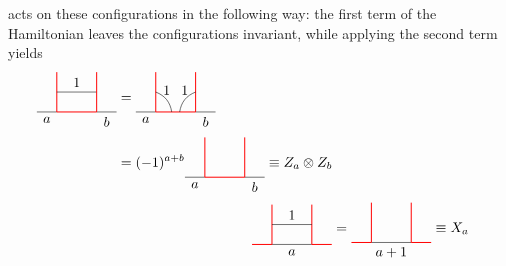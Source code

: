 acts on these configurations in the following way: the first term of the Hamiltonian leaves the configurations invariant, while applying the second term yields
	\begin{align}\label{eq:action}
	\begin{split}
		\begin{tikzpicture}[scale=1,baseline=(current bounding box.center)]
			\draw (-0.5,0) to node [below] {$a$} (0,0);
			\draw [red, line width=0.25mm] (0,0) -- (1,0);
			\draw (1,0) to node [below] {$b$} (1.5,0);
			\draw [red, line width=0.25mm] (0,0) -- (0,1);
			\draw (0,0.5) to node[above] {$1$} (1,0.5);
			\draw [red, line width=0.25mm] (1,0) -- (1,1);
		\end{tikzpicture}&=
		\begin{tikzpicture}[scale=1,baseline=(current bounding box.center)]
			\draw (-0.5,0) to node [below] {$a$} (0,0);
			\draw [red, line width=0.25mm] (0,0) -- (1,0);
			\draw (1,0) to node [below] {$b$} (1.5,0);
			\draw [red, line width=0.25mm] (0,0) -- (0,1);
			\draw [red, line width=0.25mm] (1,0) -- (1,1);
			\draw (0,0.5) to[bend left] node[above] {$1$} (0.4,0);
			\draw (1,0.5) to[bend right] node[above] {$1$} (0.6,0);
		\end{tikzpicture}\\
		&=(-1)^{a+b}
		\begin{tikzpicture}[scale=1,baseline=(current bounding box.center)]
			\draw (-0.5,0) to node [below] {$a$} (0,0);
			\draw [red, line width=0.25mm] (0,0) -- (1,0);
			\draw (1,0) to node [below] {$b$} (1.5,0);
			\draw [red, line width=0.25mm] (0,0) -- (0,1);
			\draw [red, line width=0.25mm] (1,0) -- (1,1);
		\end{tikzpicture}\equiv Z_a\otimes Z_b
		\end{split}
		\\\label{eq:action2}
		\begin{tikzpicture}[scale=1,baseline=(current bounding box.center)]
			\draw [red, line width=0.25mm] (-0.5,0) -- (0,0);
			\draw (0,0) to node[below] {$a$} (1,0);
			\draw [red, line width=0.25mm] (1,0) -- (1.5,0);
			\draw [red, line width=0.25mm] (0,0) -- (0,1);
			\draw [red, line width=0.25mm] (1,0) -- (1,1);
			\draw (0,0.5) to node[above] {$1$} (1,0.5);
		\end{tikzpicture}&=
		\begin{tikzpicture}[scale=1,baseline=(current bounding box.center)]
			\draw [red, line width=0.25mm] (-0.5,0) -- (0,0);
			\draw (0,0) to node[below] {$a+1$} (1,0);
			\draw [red, line width=0.25mm] (1,0) -- (1.5,0);
			\draw [red, line width=0.25mm] (0,0) -- (0,1);
			\draw [red, line width=0.25mm] (1,0) -- (1,1);
		\end{tikzpicture}\equiv X_a
	\end{align}
